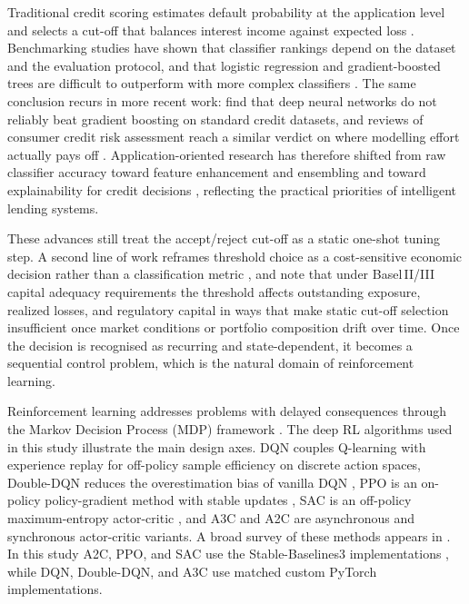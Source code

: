 \documentclass[preprint,review,authoryear,12pt]{elsarticle}
\begin{document}
Traditional credit scoring estimates default probability at the application level and
selects a cut-off that balances interest income against expected loss
\citep{thomas2017, hand1997, siddiqi2006}. Benchmarking studies have shown that
classifier rankings depend on the dataset and the evaluation protocol, and that
logistic regression and gradient-boosted trees are difficult to outperform with more
complex classifiers \citep{lessmann2015, baesens2003}. The same conclusion recurs in
more recent work: \citet{gunnarsson2021} find that deep neural networks do not reliably
beat gradient boosting on standard credit datasets, and reviews of consumer credit risk
assessment reach a similar verdict on where modelling effort actually pays off
\citep{zhangyu2023}. Application-oriented research has therefore shifted from raw
classifier accuracy toward feature enhancement and ensembling \citep{yang2024}
and toward explainability for credit decisions \citep{nallakaruppan2024}, reflecting the
practical priorities of intelligent lending systems.

These advances still treat the accept/reject cut-off as a static one-shot tuning step.
A second line of work reframes threshold choice as a cost-sensitive economic decision
rather than a classification metric \citep{baesens2003}, and \citet{bellotti2009} note
that under Basel\,II/III capital adequacy requirements the threshold affects outstanding
exposure, realized losses, and regulatory capital in ways that make static cut-off
selection insufficient once market conditions or portfolio composition drift over time.
Once the decision is recognised as recurring and state-dependent, it becomes a
sequential control problem, which is the natural domain of reinforcement learning.

Reinforcement learning addresses problems with delayed consequences through the Markov
Decision Process (MDP) framework \citep{dayan2008, arulkumaran2017}. The deep RL
algorithms used in this study illustrate the main design axes. DQN couples Q-learning
with experience replay for off-policy sample efficiency on discrete action spaces,
Double-DQN reduces the overestimation bias of vanilla DQN \citep{van2016ddqn}, PPO is an
on-policy policy-gradient method with stable updates \citep{schulman2017ppo}, SAC is an
off-policy maximum-entropy actor-critic \citep{haarnoja2018sac}, and A3C and A2C are
asynchronous and synchronous actor-critic variants. A broad survey of these methods
appears in \citet{arulkumaran2017}. In this study A2C, PPO, and SAC use the
Stable-Baselines3 implementations \citep{stable_baselines3}, while DQN, Double-DQN, and
A3C use matched custom PyTorch implementations.
\end{document}
